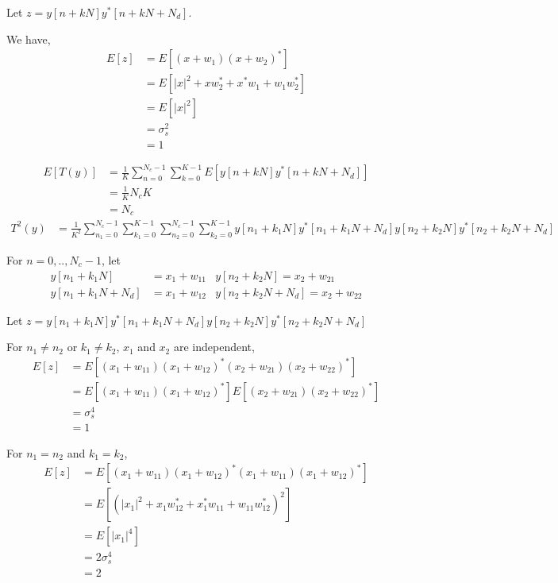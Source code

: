 \documentclass[a4 paper]{article}
\begin{document}
Let $z =  y[n+kN] y^{*} [n+kN+N_{d}]$.

We have,
\begin{align*}
	E[z] &= E[(x + w_{1})(x + w_{2})^{*}]	\\
		&= E[\vert x \vert ^{2} + xw_{2}^{*} + x^{*}w_{1} + w_{1}w_{2}^{*}]	\\
		&= E[\vert x \vert ^{2}]	\\
		&= \sigma_{s}^{2}	\\
		&= 1
\end{align*}

\begin{align*}
	E[T(y)] &= \frac{1}{K} \sum_{n=0}^{N_{c}-1} \sum_{k=0}^{K-1} E[y[n+kN] y^{*} [n+kN+N_{d}]]	\\
		&= \frac{1}{K} N_{c} K	\\
		&= N_{c}
\end{align*}
\begin{align*}
	T^{2}(y) &= \frac{1}{K^{2}} \sum_{n_{1}=0}^{N_{c}-1} \sum_{k_{1}=0}^{K-1} \sum_{n_{2}=0}^{N_{c}-1} \sum_{k_{2}=0}^{K-1} y[n_{1}+k_{1}N] y^{*} [n_{1}+k_{1}N+N_{d}] y[n_{2}+k_{2}N] y^{*} [n_{2}+k_{2}N+N_{d}]
\end{align*}


For $n=0, .., N_{c} -1$, let
\begin{align*}
	y[n_{1} + k_{1}N] &= x_{1} + w_{11}			&y[n_{2}+k_{2}N] = x_{2} + w_{21}		\\
	y[n_{1} + k_{1}N+N_{d}] &= x_{1} + w_{12}		&y[n_{2}+k_{2}N+N_{d}] = x_{2} + w_{22}
\end{align*}

Let $z = y[n_{1}+k_{1}N] y^{*} [n_{1}+k_{1}N+N_{d}] y[n_{2}+k_{2}N] y^{*} [n_{2}+k_{2}N+N_{d}]$


For $n_{1} \neq n_{2}$ or $k_{1} \neq k_{2}$, $x_{1}$ and $x_{2}$ are independent,
\begin{align*}
	E[z] &= E[(x_{1} + w_{11}) (x_{1} + w_{12})^{*} (x_{2} + w_{21}) (x_{2} + w_{22})^{*}]	\\
		&= E[(x_{1} + w_{11}) (x_{1} + w_{12})^{*}] E[(x_{2} + w_{21}) (x_{2} + w_{22})^{*}]	\\
		&= \sigma_{s}^{4}	\\
		&= 1
\end{align*}

For $n_{1} = n_{2}$ and $k_{1} = k_{2}$,
\begin{align*}
	E[z] &= E[(x_{1} + w_{11}) (x_{1} + w_{12})^{*} (x_{1} + w_{11}) (x_{1} + w_{12})^{*}]	\\
		&= E[(\vert x_{1} \vert ^{2} + x_{1}w_{12}^{*} + x_{1}^{*}w_{11} + w_{11}w_{12}^{*})^{2}]	\\
		&= E[\vert x_{1} \vert ^{4}]	\\
		&= 2\sigma_{s}^{4}	\\
		&= 2
\end{align*}
\end{document}
